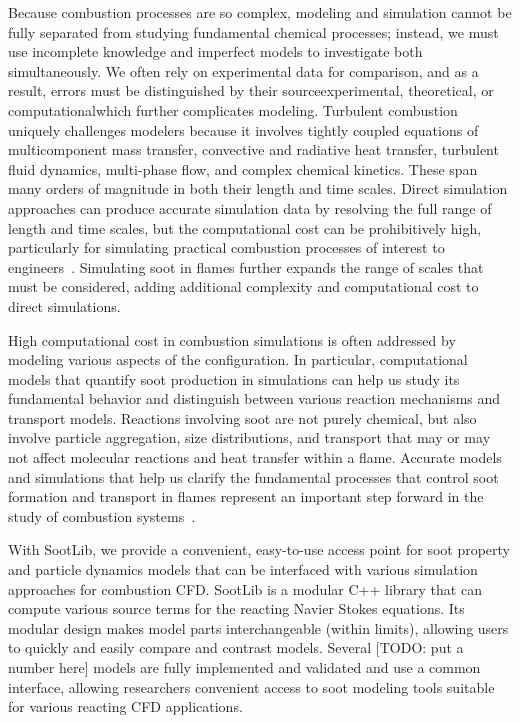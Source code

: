 \documentclass[preprint,12pt,letterpaper]{elsarticle}
\begin{document}
Because combustion processes are so complex, modeling and simulation cannot be fully separated from studying fundamental chemical processes; instead, we must use incomplete knowledge and imperfect models to investigate both simultaneously. We often rely on experimental data for comparison, and as a result, errors must be distinguished by their source\textemdash experimental, theoretical, or computational\textemdash which further complicates modeling. Turbulent combustion uniquely challenges modelers because it involves tightly coupled equations of multicomponent mass transfer, convective and radiative heat transfer, turbulent fluid dynamics, multi-phase flow, and complex chemical kinetics. These span many orders of magnitude in both their length and time scales. Direct simulation approaches can produce accurate simulation data by resolving the full range of length and time scales, but the computational cost can be prohibitively high, particularly for simulating practical combustion processes of interest to engineers~\cite{Pope_2000,Bernard_2002}. Simulating soot in flames further expands the range of scales that must be considered, adding additional complexity and computational cost to direct simulations.

High computational cost in combustion simulations is often addressed by modeling various aspects of the configuration. In particular, computational models that quantify soot production in simulations can help us study its fundamental behavior and distinguish between various reaction mechanisms and transport models. Reactions involving soot are not purely chemical, but also involve particle aggregation, size distributions, and transport that may or may not affect molecular reactions and heat transfer within a flame. Accurate models and simulations that help us clarify the fundamental processes that control soot formation and transport in flames represent an important step forward in the study of combustion systems~\cite{Frenklach_2002b}.

With SootLib, we provide a convenient, easy-to-use access point for soot property and particle dynamics models that can be interfaced with various simulation approaches for combustion CFD. SootLib is a modular C++ library that can compute various source terms for the reacting Navier Stokes equations. Its modular design makes model parts interchangeable (within limits), allowing users to quickly and easily compare and contrast models. Several [TODO: put a number here] models are fully implemented and validated and use a common interface, allowing researchers convenient access to soot modeling tools suitable for various reacting CFD applications.
\end{document}
